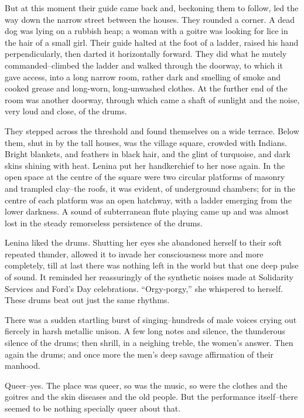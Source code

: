 \documentclass[12pt]{report}
\begin{document}
But at this moment their guide came back and, beckoning them to follow,
led the way down the narrow street between the houses. They rounded a
corner. A dead dog was lying on a rubbish heap; a woman with a goitre
was looking for lice in the hair of a small girl. Their guide halted at
the foot of a ladder, raised his hand perpendicularly, then darted it
horizontally forward. They did what he mutely commanded--climbed the
ladder and walked through the doorway, to which it gave access, into a
long narrow room, rather dark and smelling of smoke and cooked grease
and long-worn, long-unwashed clothes. At the further end of the room was
another doorway, through which came a shaft of sunlight and the noise,
very loud and close, of the drums.

They stepped across the threshold and found themselves on a wide
terrace. Below them, shut in by the tall houses, was the village square,
crowded with Indians. Bright blankets, and feathers in black hair, and
the glint of turquoise, and dark skins shining with heat. Lenina put her
handkerchief to her nose again. In the open space at the centre of the
square were two circular platforms of masonry and trampled clay--the
roofs, it was evident, of underground chambers; for in the centre of
each platform was an open hatchway, with a ladder emerging from the
lower darkness. A sound of subterranean flute playing came up and was
almost lost in the steady remorseless persistence of the drums.

Lenina liked the drums. Shutting her eyes she abandoned herself to their
soft repeated thunder, allowed it to invade her consciousness more and
more completely, till at last there was nothing left in the world but
that one deep pulse of sound. It reminded her reassuringly of the
synthetic noises made at Solidarity Services and Ford's Day
celebrations. ``Orgy-porgy,'' she whispered to herself. These drums beat
out just the same rhythms.

There was a sudden startling burst of singing--hundreds of male voices
crying out fiercely in harsh metallic unison. A few long notes and
silence, the thunderous silence of the drums; then shrill, in a neighing
treble, the women's answer. Then again the drums; and once more the
men's deep savage affirmation of their manhood.

Queer--yes. The place was queer, so was the music, so were the clothes
and the goitres and the skin diseases and the old people. But the
performance itself--there seemed to be nothing specially queer about
that.
\end{document}
